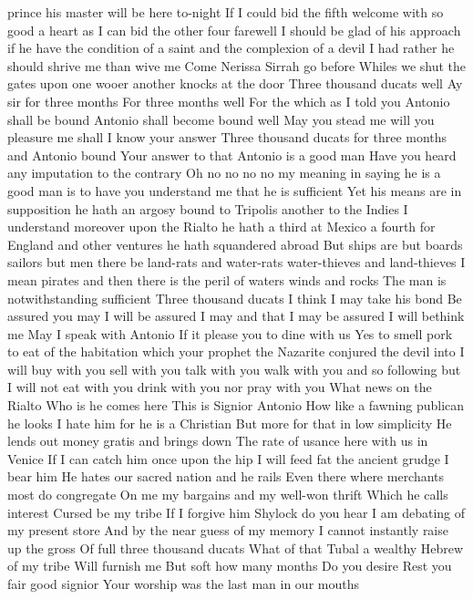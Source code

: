 prince his master will be here to-night 
If I could bid the fifth welcome with so good a 
heart as I can bid the other four farewell I should 
be glad of his approach if he have the condition 
of a saint and the complexion of a devil I had 
rather he should shrive me than wive me Come 
Nerissa Sirrah go before 
Whiles we shut the gates 
upon one wooer another knocks at the door 
Three thousand ducats well 
Ay sir for three months 
For three months well 
For the which as I told you Antonio shall be bound 
Antonio shall become bound well 
May you stead me will you pleasure me shall I 
know your answer 
Three thousand ducats for three months and Antonio bound 
Your answer to that 
Antonio is a good man 
Have you heard any imputation to the contrary 
Oh no no no no my meaning in saying he is a 
good man is to have you understand me that he is 
sufficient Yet his means are in supposition he 
hath an argosy bound to Tripolis another to the 
Indies I understand moreover upon the Rialto he 
hath a third at Mexico a fourth for England and 
other ventures he hath squandered abroad But ships 
are but boards sailors but men there be land-rats 
and water-rats water-thieves and land-thieves I 
mean pirates and then there is the peril of waters 
winds and rocks The man is notwithstanding 
sufficient Three thousand ducats I think I may 
take his bond 
Be assured you may 
I will be assured I may and that I may be assured 
I will bethink me May I speak with Antonio 
If it please you to dine with us 
Yes to smell pork to eat of the habitation which 
your prophet the Nazarite conjured the devil into I 
will buy with you sell with you talk with you 
walk with you and so following but I will not eat 
with you drink with you nor pray with you What 
news on the Rialto Who is he comes here 
This is Signior Antonio 
How like a fawning publican he looks 
I hate him for he is a Christian 
But more for that in low simplicity 
He lends out money gratis and brings down 
The rate of usance here with us in Venice 
If I can catch him once upon the hip 
I will feed fat the ancient grudge I bear him 
He hates our sacred nation and he rails 
Even there where merchants most do congregate 
On me my bargains and my well-won thrift 
Which he calls interest Cursed be my tribe 
If I forgive him 
Shylock do you hear 
I am debating of my present store 
And by the near guess of my memory 
I cannot instantly raise up the gross 
Of full three thousand ducats What of that 
Tubal a wealthy Hebrew of my tribe 
Will furnish me But soft how many months 
Do you desire 
Rest you fair good signior 
Your worship was the last man in our mouths 
